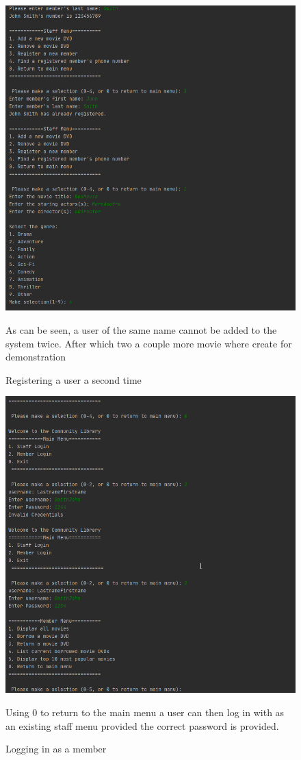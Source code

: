 \documentclass[a4paper,12pt]{article}
\begin{document}
\begin{figure}[!htb]
\centering
\includegraphics[width=1\textwidth]{5}
\caption{Registering a user a second time}
\medskip
\small
As can be seen, a user of the same name cannot be added to the system twice. After which two a couple more movie where create for demonstration
\end{figure}


\begin{figure}[!htb]
\centering
\includegraphics[width=1\textwidth]{6}
\caption{Logging in as a member}
\medskip
\small
Using 0 to return to the main menu a user can then log in with as an existing staff menu provided the correct password is provided.
\end{figure}
\end{document}
